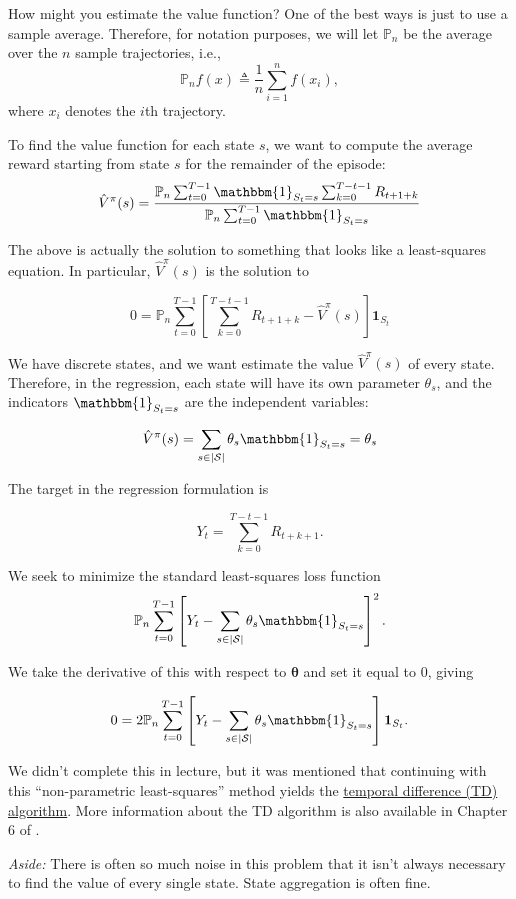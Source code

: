 \documentclass[11pt]{article}
\begin{document}
How might you estimate the value function? One of the best ways is just to use a sample average. Therefore, for notation purposes, we will let $\mathbb{P}_n$ be the average over the $n$ sample trajectories, i.e., 
$$\mathbb{P}_n f(x) \triangleq \frac{1}{n}\sum_{i = 1}^n f(x_i),$$ where $x_i$ denotes the $i$th trajectory.

To find the value function for each state $s$, we want to compute the average reward starting from state $s$ for the remainder of the episode:
$$\hat{V}^\pi(s) = \frac{\mathbb{P}_n \sum_{t = 0}^{T-1} \mathbbm{1}_{S_t=s} \sum_{k=0}^{T-t-1}R_{t+1+k}}{\mathbb{P}_n \sum_{t=0}^{T-1} \mathbbm{1}_{S_t = s}} $$

The above is actually the solution to something that looks like a least-squares equation. In particular, $\hat{V}^\pi(s)$ is the solution to

$$0 = \mathbb{P}_n \sum_{t=0}^{T-1} \left[\sum_{k=0}^{T-t-1}R_{t+1+k} -\hat{V}^\pi(s)\right]\boldsymbol{1}_{S_t}$$

We have discrete states, and we want estimate the value $\hat{V}^\pi(s)$ of every state. Therefore, in the regression, each state will have its own parameter $\theta_s$, and the indicators $\mathbbm{1}_{S_t = s}$ are the independent variables:

$$\hat{V}^\pi(s) = \sum_{s \in |\mathcal{S}|} \theta_s\mathbbm{1}_{S_t = s} = \theta_s$$

The target in the regression formulation is

$$Y_t = \sum_{k=0}^{T - t - 1} R_{t+k+1}.$$

We seek to minimize the standard least-squares loss function $$\mathbb{P}_n \sum_{t = 0}^{T-1} \left[Y_t - \sum_{s \in |\mathcal{S}|} \theta_s\mathbbm{1}_{S_t = s}\right]^2.$$

We take the derivative of this with respect to $\boldsymbol{\theta}$ and set it equal to 0, giving

$$0 = 2 \mathbb{P}_n \sum_{t=0}^{T-1}\left[Y_t - \sum_{s \in |\mathcal{S}|} \theta_s \mathbbm{1}_{S_t = s}\right] \boldsymbol{1}_{S_t}.$$

We didn't complete this in lecture, but it was mentioned that continuing with this ``non-parametric least-squares'' method yields the \href{https://en.wikipedia.org/wiki/Temporal_difference_learning}{temporal difference (TD) algorithm}. More information about the TD algorithm is also available in Chapter 6 of \cite{suttonbarto}. 

\textit{Aside:} There is often so much noise in this problem that it isn't always necessary to find the value of every single state. State aggregation is often fine.
\end{document}
